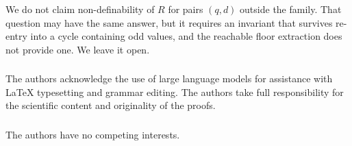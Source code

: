 \documentclass[runningheads]{llncs}
\begin{document}
We do not claim non-definability of $R$ for pairs $(q,d)$ outside the
family. That question may have the same answer, but it requires an
invariant that survives re-entry into a cycle containing odd values, and
the reachable floor extraction does not provide one. We leave it open.

\begin{credits}
\subsubsection{\ackname}
The authors acknowledge the use of large language models for assistance
with \LaTeX{} typesetting and grammar editing. The authors take full
responsibility for the scientific content and originality of the proofs.
\subsubsection{\discintname}
The authors have no competing interests.
\end{credits}
\end{document}
